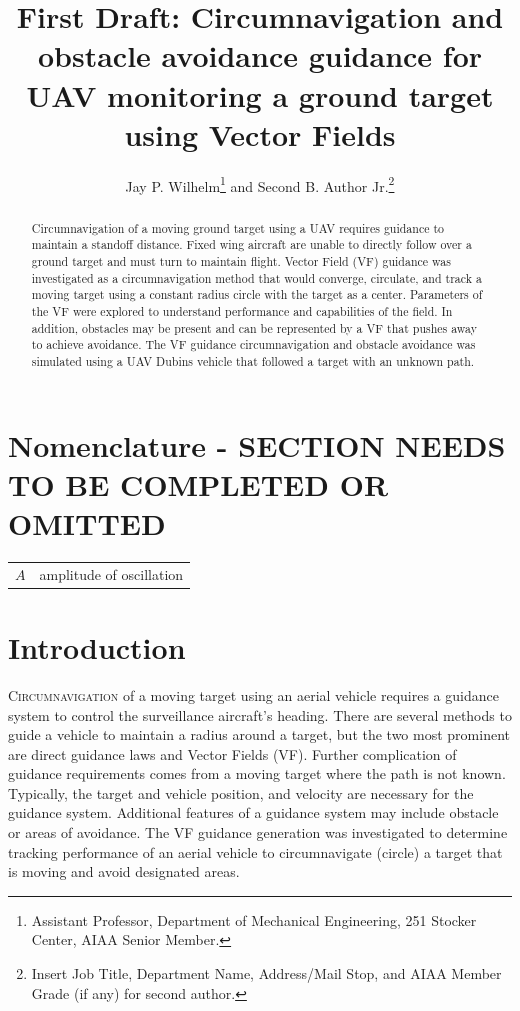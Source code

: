 \documentclass[conf]{new-aiaa}
\title{First Draft: Circumnavigation and obstacle avoidance guidance for UAV monitoring a ground target using Vector Fields}
\author{Jay P. Wilhelm\footnote{Assistant Professor, Department of Mechanical Engineering, 251 Stocker Center, AIAA Senior Member.} and Second B. Author Jr.\footnote{Insert Job Title, Department Name, Address/Mail Stop, and AIAA Member Grade (if any) for second author.}}
\affil{Ohio University, Athens, OH, 45701}
\begin{document}
\maketitle

\begin{abstract}
Circumnavigation of a moving ground target using a UAV requires guidance to maintain a standoff distance. Fixed wing aircraft are unable to directly follow over a ground target and must turn to maintain flight. Vector Field (VF) guidance was investigated as a circumnavigation method that would converge, circulate, and track a moving target using a constant radius circle with the target as a center. Parameters of the VF were explored to understand performance and capabilities of the field. In addition, obstacles may be present and can be represented by a VF that pushes away to achieve avoidance. The VF guidance circumnavigation and obstacle avoidance was simulated using a UAV Dubins vehicle that followed a target with an unknown path.
\end{abstract}

\section{Nomenclature - SECTION NEEDS TO BE COMPLETED OR OMITTED}

{\renewcommand\arraystretch{1.0}
\noindent\begin{longtable*}{@{}l @{\quad=\quad} l@{}}
$A$  & amplitude of oscillation \\

\end{longtable*}}

\section{Introduction}
\lettrine{C}{ircumnavigation} of a moving target using an aerial vehicle requires a guidance system to control the surveillance aircraft's heading. There are several methods to guide a vehicle to maintain a radius around a target, but the two most prominent are direct guidance laws and Vector Fields (VF). Further complication of guidance requirements comes from a moving target where the path is not known. Typically, the target and vehicle position, and velocity are necessary for the guidance system. Additional features of a guidance system may include obstacle or areas of avoidance. The VF guidance generation was investigated to determine tracking performance of an aerial vehicle to circumnavigate (circle) a target that is moving and avoid designated areas.
\end{document}
